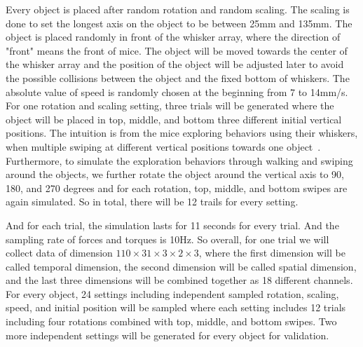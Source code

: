 Every object is placed after random rotation and random scaling. The scaling is done to set the longest axis on the object to be between 25mm and 135mm. The object is placed randomly in front of the whisker array, where the direction of "front" means the front of mice.
The object will be moved towards the center of the whisker array and the position of the object will be adjusted later to avoid the possible collisions between the object and the fixed bottom of whiskers.
The absolute value of speed is randomly chosen at the beginning from 7 to 14mm/s.
For one rotation and scaling setting, three trials will be generated where the object will be placed in top, middle, and bottom three different initial vertical positions. The intuition is from the mice exploring behaviors using their whiskers, when multiple swiping at different vertical positions towards one object~\cite{hobbs2015spatiotemporal}.
Furthermore, to simulate the exploration behaviors through walking and swiping around the objects, we further rotate the object around the vertical axis to 90, 180, and 270 degrees and for each rotation, top, middle, and bottom swipes are again simulated.
So in total, there will be 12 trails for every setting.

And for each trial, the simulation lasts for 11 seconds for every trial. And the sampling rate of forces and torques is 10Hz. 
So overall, for one trial we will collect data of dimension $110 \times 31 \times 3 \times 2 \times 3$, where the first dimension will be called temporal dimension, the second dimension will be called spatial dimension, and the last three dimensions will be combined together as 18 different channels.
For every object, 24 settings including independent sampled rotation, scaling, speed, and initial position will be sampled where each setting includes 12 trials including four rotations combined with top, middle, and bottom swipes. Two more independent settings will be generated for every object for validation.
